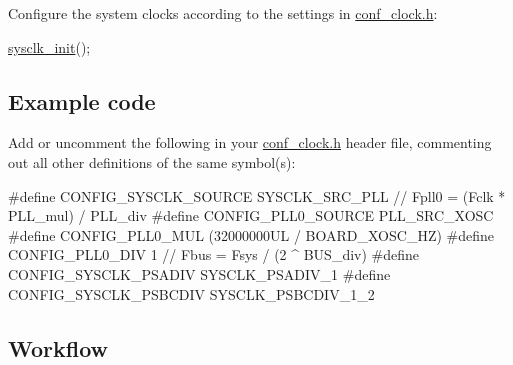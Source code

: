 \begin{DoxyEnumerate}
\item Configure the system clocks according to the settings in \hyperlink{conf__clock_8h}{conf\-\_\-clock.\-h}\-: 
\begin{DoxyCode}
 \hyperlink{group__sysclk__group_ga242399e48a97739c88b4d0c00f6101de}{sysclk\_init}(); 
\end{DoxyCode}

\end{DoxyEnumerate}\hypertarget{sysclk_quickstart_sysclk_quickstart_use_case_1_example_code}{}\subsection{Example code}\label{sysclk_quickstart_sysclk_quickstart_use_case_1_example_code}
Add or uncomment the following in your \hyperlink{conf__clock_8h}{conf\-\_\-clock.\-h} header file, commenting out all other definitions of the same symbol(s)\-: 
\begin{DoxyCode}
\textcolor{preprocessor}{           #define CONFIG\_SYSCLK\_SOURCE        SYSCLK\_SRC\_PLL}
\textcolor{preprocessor}{}
           \textcolor{comment}{// Fpll0 = (Fclk * PLL\_mul) / PLL\_div}
\textcolor{preprocessor}{           #define CONFIG\_PLL0\_SOURCE          PLL\_SRC\_XOSC}
\textcolor{preprocessor}{}\textcolor{preprocessor}{           #define CONFIG\_PLL0\_MUL             (32000000UL / BOARD\_XOSC\_HZ)}
\textcolor{preprocessor}{}\textcolor{preprocessor}{           #define CONFIG\_PLL0\_DIV             1}
\textcolor{preprocessor}{}
           \textcolor{comment}{// Fbus = Fsys / (2 ^ BUS\_div)}
\textcolor{preprocessor}{           #define CONFIG\_SYSCLK\_PSADIV        SYSCLK\_PSADIV\_1}
\textcolor{preprocessor}{           #define CONFIG\_SYSCLK\_PSBCDIV       SYSCLK\_PSBCDIV\_1\_2}
\end{DoxyCode}
\hypertarget{sysclk_quickstart_sysclk_quickstart_use_case_1_example_workflow}{}\subsection{Workflow}\label{sysclk_quickstart_sysclk_quickstart_use_case_1_example_workflow}

